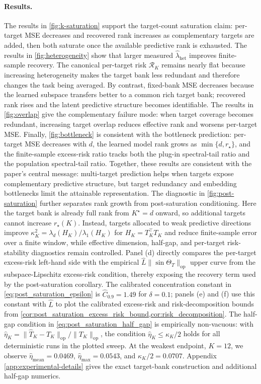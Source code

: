 \paragraph{Results.}
The results in \cref{fig:k-saturation} support the target-count saturation claim:
per-target MSE decreases and recovered rank increases as complementary targets
are added, then both saturate once the available predictive rank is exhausted.
The results in \cref{fig:heterogeneity} show that larger measured
$\widehat{\lambda}_{\mathrm{het}}$ improves finite-sample recovery. The
canonical per-target risk $\mathcal R_K$ remains nearly flat because increasing
heterogeneity makes the target bank less redundant and therefore changes the
task being averaged. By contrast, fixed-bank MSE decreases because the learned
subspace transfers better to a common rich target bank; recovered rank rises and
the latent predictive structure becomes identifiable. The results in
\cref{fig:overlap} give the complementary failure mode: when target coverage
becomes redundant, increasing target overlap reduces effective rank and worsens
per-target MSE. Finally, \cref{fig:bottleneck} is consistent with the
bottleneck prediction: per-target MSE decreases with $d$, the learned model rank grows
as $\min\{d,r_\star\}$, and the finite-sample excess-risk ratio tracks both the
plug-in spectral-tail ratio and the population spectral-tail ratio. Together,
these results are consistent with the paper's
central message: multi-target prediction helps when targets expose
complementary predictive structure, but target redundancy and embedding
bottlenecks limit the attainable representation.
The diagnostic in \cref{fig:post-saturation} further separates rank growth from
post-saturation conditioning. Here the target bank is already full rank from
$K^\star=d$ onward, so additional targets cannot increase $r_\star(K)$. Instead,
targets allocated to weak predictive directions improve
$\kappa_K^2=\lambda_d(H_K)/\lambda_1(H_K)$ for
$H_K=T_K^\top T_K$ and reduce finite-sample error over a finite window, while
effective dimension, half-gap, and per-target risk-stability diagnostics remain
controlled. Panel (d) directly compares the per-target excess-risk left-hand
side with the empirical $\widehat L\|\sin\Theta_T\|_{\mathrm{op}}$ upper curve
from the subspace-Lipschitz excess-risk condition,
thereby exposing the recovery term used by the post-saturation corollary. The
calibrated concentration constant in \eqref{eq:post_saturation_epsilon} is
$\widehat C_{0.9}=1.49$ for $\delta=0.1$; panels (e) and (f) use this constant
with $\widehat L$ to plot the calibrated excess-risk and risk-decomposition
bounds from
\cref{cor:post_saturation_excess_risk_bound,cor:risk_decomposition}. The
half-gap condition in
\eqref{eq:post_saturation_half_gap} is empirically non-vacuous: with
$\widehat{\eta}_K
=\|\widehat T_K-T_K\|_{\mathrm{op}}/
\|T_K\|_{\mathrm{op}}$, the condition
$\widehat{\eta}_K\le \kappa_K/2$ holds for all deterministic runs in the
plotted sweep. At the weakest endpoint, $K=12$, we observe
$\widehat{\eta}_{\mathrm{mean}}=0.0469$,
$\widehat{\eta}_{\max}=0.0543$, and $\kappa_K/2=0.0707$. Appendix
\cref{app:experimental-details} gives the exact target-bank construction and
additional half-gap numerics.


